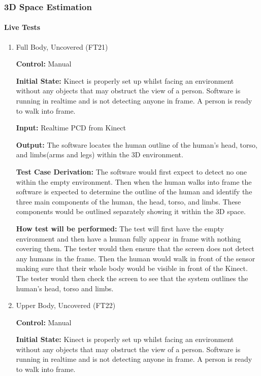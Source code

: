 \documentclass[12pt, titlepage]{article}
\begin{document}
\subsubsection{3D Space Estimation}

\paragraph{Live Tests}
\begin{enumerate}
  \item{Full Body, Uncovered (FT21)\\}

  \textbf{Control:} Manual

  \textbf{Initial State:} Kinect is properly set up whilst facing an environment without any objects that may obstruct the view of a person. Software is running in realtime and is not detecting anyone in frame. A person is ready to walk into frame.
  
  \textbf{Input:} Realtime PCD from Kinect
  
  \textbf{Output:} The software locates the human outline of the human’s head, torso, and limbs(arms and legs) within the 3D environment. 
  
  \textbf{Test Case Derivation:} The software would first expect to detect no one within the empty environment. Then when the human walks into frame the software is expected to determine the outline of the human and identify the three main components of the human, the head, torso, and limbs. These components would be outlined separately showing it within the 3D space.
  
  \textbf{How test will be performed:} The test will first have the empty  environment and then have a human fully appear in frame with nothing covering them. The tester would then ensure that the screen does not detect any humans in the frame. Then the human would walk in front of the sensor making sure that their whole body would be visible in front of the Kinect. The tester would then check the screen to see that the system outlines the human’s head, torso and limbs.

  \item{Upper Body, Uncovered (FT22)\\}
  
  \textbf{Control:} Manual
  
  \textbf{Initial State:} Kinect is properly set up whilst facing an environment without any objects that may obstruct the view of a person. Software is running in realtime and is not detecting anyone in frame. A person is ready to walk into frame.
  

\end{enumerate}
\end{document}

